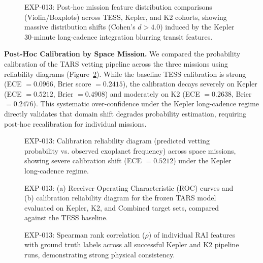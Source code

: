 

\begin{figure}[htbp]
\centering
{}
\caption{EXP-013: Post-hoc mission feature distribution comparisons (Violin/Boxplots) across TESS, Kepler, and K2 cohorts, showing massive distribution shifts (Cohen's $d > 4.0$) induced by the Kepler 30-minute long-cadence integration blurring transit features.}
\label{fig:mission_shift_distributions}
\end{figure}

\textbf{Post-Hoc Calibration by Space Mission.}
We compared the probability calibration of the TARS vetting pipeline across the three missions using reliability diagrams (Figure~\ref{fig:calibration_by_mission}). While the baseline TESS calibration is strong (ECE $= 0.0966$, Brier score $= 0.2415$), the calibration decays severely on Kepler (ECE $= 0.5212$, Brier $= 0.4908$) and moderately on K2 (ECE $= 0.2638$, Brier $= 0.2476$). This systematic over-confidence under the Kepler long-cadence regime directly validates that domain shift degrades probability estimation, requiring post-hoc recalibration for individual missions.

\begin{figure}[htbp]
\centering
{}
\caption{EXP-013: Calibration reliability diagram (predicted vetting probability vs. observed exoplanet frequency) across space missions, showing severe calibration shift (ECE $= 0.5212$) under the Kepler long-cadence regime.}
\label{fig:calibration_by_mission}
\end{figure}



\begin{figure}[htbp]
\centering
{}
\caption{EXP-013: (a) Receiver Operating Characteristic (ROC) curves and (b) calibration reliability diagram for the frozen TARS model evaluated on Kepler, K2, and Combined target sets, compared against the TESS baseline.}
\label{fig:exp013_roc_cal}
\end{figure}

\begin{figure}[htbp]
\centering
{}
\caption{EXP-013: Spearman rank correlation ($\rho$) of individual RAI features with ground truth labels across all successful Kepler and K2 pipeline runs, demonstrating strong physical consistency.}
\label{fig:exp013_corr}
\end{figure}

